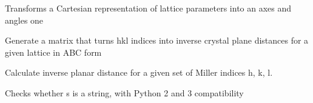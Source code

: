 \documentclass[letterpaper,10pt,english]{sphinxmanual}
\begin{document}

\begin{fulllineitems}
\label{doctree/soprano.utils:soprano.utils.cart2abc}
Transforms a Cartesian representation of lattice parameters
into an axes and angles one

\end{fulllineitems}


\begin{fulllineitems}
\label{doctree/soprano.utils:soprano.utils.hkl2d2_matgen}
Generate a matrix that turns hkl indices into inverse crystal
plane distances for a given lattice in ABC form

\end{fulllineitems}


\begin{fulllineitems}
\label{doctree/soprano.utils:soprano.utils.inspect_args}
\end{fulllineitems}


\begin{fulllineitems}
\label{doctree/soprano.utils:soprano.utils.inv_plane_dist}
Calculate inverse planar distance for a given set of
Miller indices h, k, l.

\end{fulllineitems}


\begin{fulllineitems}
\label{doctree/soprano.utils:soprano.utils.is_string}
Checks whether s is a string, with Python 2 and 3 compatibility

\end{fulllineitems}

\end{document}
